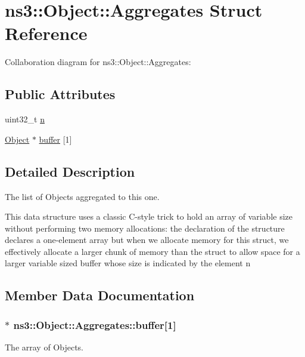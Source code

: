 \hypertarget{structns3_1_1Object_1_1Aggregates}{}\section{ns3\+:\+:Object\+:\+:Aggregates Struct Reference}
\label{structns3_1_1Object_1_1Aggregates}


Collaboration diagram for ns3\+:\+:Object\+:\+:Aggregates\+:
\subsection*{Public Attributes}
\begin{DoxyCompactItemize}
\item 
uint32\+\_\+t \hyperlink{structns3_1_1Object_1_1Aggregates_a3157f15eafcbf5f0ec5c85d390853829}{n}
\item 
\hyperlink{classns3_1_1Object}{Object} $\ast$ \hyperlink{structns3_1_1Object_1_1Aggregates_ad7680c3fcf46fefedf8ef443e64448be}{buffer} \mbox{[}1\mbox{]}
\end{DoxyCompactItemize}


\subsection{Detailed Description}
The list of Objects aggregated to this one.

This data structure uses a classic C-\/style trick to hold an array of variable size without performing two memory allocations\+: the declaration of the structure declares a one-\/element array but when we allocate memory for this struct, we effectively allocate a larger chunk of memory than the struct to allow space for a larger variable sized buffer whose size is indicated by the element {\ttfamily n} 

\subsection{Member Data Documentation}
\subsubsection[{\texorpdfstring{buffer}{buffer}}]{$\ast$ ns3\+::\+Object\+::\+Aggregates\+::buffer\mbox{[}1\mbox{]}}\hypertarget{structns3_1_1Object_1_1Aggregates_ad7680c3fcf46fefedf8ef443e64448be}{}\label{structns3_1_1Object_1_1Aggregates_ad7680c3fcf46fefedf8ef443e64448be}
The array of Objects. 

